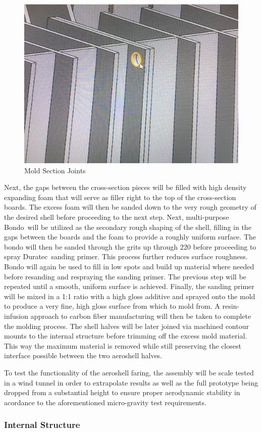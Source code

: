 \begin{figure}[H]
  \centering
  \includegraphics[width=.3\textwidth]{Figures/Section_Joint.PNG}
  \caption{\label{fig:Section_Joint} Mold Section Joints}
\end{figure}

\indent\indent Next, the gaps between the cross-section pieces will be filled with high density expanding foam that will serve as filler right to the top of the cross-section boards. The excess foam will then be sanded down to the very rough geometry of the desired shell before proceeding to the next step. Next, multi-purpose Bondo\texttrademark\ will be utilized as the secondary rough shaping of the shell, filling in the gaps between the boards and the foam to provide a roughly uniform surface. The bondo will then be sanded through the grits up through 220 before proceeding to spray Duratec\texttrademark\ sanding primer. This process further reduces surface roughness. Bondo will again be used to fill in low spots and build up material where needed before resanding and respraying the sanding primer. The previous step will be repeated until a smooth, uniform surface is achieved. Finally, the sanding primer will be mixed in a 1:1 ratio with a high gloss additive and sprayed onto the mold to produce a very fine, high gloss surface from which to mold from. A resin-infusion approach to carbon fiber manufacturing will then be taken to complete the molding process. The shell halves will be later joined via machined contour mounts to the internal structure before trimming off the excess mold material. This way the maximum material is removed while still preserving the closest interface possible between the two aeroshell halves. 

\indent\indent To test the functionality of the aeroshell faring, the assembly will be scale tested in a wind tunnel in order to extrapolate results as well as the full prototype being dropped from a substantial height to ensure proper aerodynamic stability in acordance to the aforementioned micro-gravity test requirements.

\subsubsection{Internal Structure}


